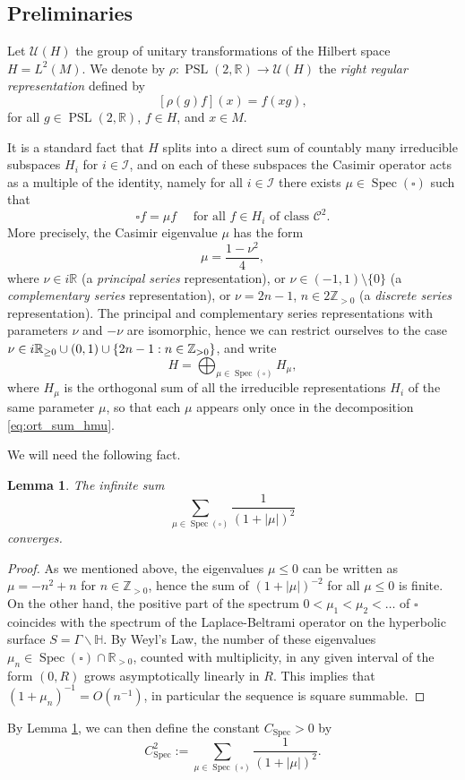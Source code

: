 \documentclass[11pt]{article}
\newcommand \R{\mathbb{R}}
\newcommand \Hbb{\mathbb{H}}
\newcommand \Z{\mathbb{Z}}
\DeclareMathOperator{\PSL}{PSL}
\DeclareMathOperator{\Spec}{Spec}
\newtheorem {lemma}[theorem]{Lemma}
\theoremstyle{definition}
\begin{document}
\subsection{Preliminaries}

Let $\mathcal{U}(H)$ the group of unitary transformations of the Hilbert space $H= L^2(M)$.
We denote by $\rho \colon \PSL(2,\R) \to \mathcal{U}(H)$ the \emph{right regular representation} defined by
\[
[\rho(g)f](x) = f(xg),
\]
for all $g \in \PSL(2,\R)$, $f \in H$, and $x \in M$.

It is a standard fact that $H$ splits into a direct sum of countably many irreducible subspaces $H_{i}$ for $i \in \mathcal{I}$, and on each of these subspaces the Casimir operator acts as a multiple of the identity, namely for all $i \in \mathcal{I}$ there exists $\mu \in \Spec(\square)$ such that
\[
\square f = \mu f \quad \text{ for all $f \in H_i$ of class $\mathscr{C}^2$}.
\]
More precisely, the Casimir eigenvalue $\mu$ has the form
\[
\mu = \frac{1-\nu^2}{4},
\]
where $\nu \in i\R$ (a \emph{principal series} representation), or $\nu \in (-1,1) \setminus \{0\}$ (a \emph{complementary series} representation), or $\nu = 2n-1$, $n \in 2\Z_{>0}$ (a \emph{discrete series} representation).
The principal and complementary series representations with parameters $\nu$ and $-\nu$ are isomorphic, hence we can restrict ourselves to the case $\nu \in i\R_{\geq 0} \cup (0,1) \cup\allowbreak \{ 2n-\nobreak 1 :\nobreak n \in\nobreak \Z_{>0}\}$, and write
\begin{equation}\label{eq:ort_sum_hmu}
H= \bigoplus_{\mu \in \Spec(\square)} H_{\mu},
\end{equation}
where $H_\mu$ is the orthogonal sum of all the irreducible representations $H_i$ of the same parameter $\mu$, so that each $\mu$ appears only once in the decomposition \eqref{eq:ort_sum_hmu}.

We will need the following fact.
\begin{lemma}\label{lemma:Weyl}
The infinite sum
\[
\sum_{\mu \in \Spec(\square)} \frac{1}{(1+|\mu|)^2}
\]
converges.
\end{lemma}
\begin{proof}
As we mentioned above, the eigenvalues $\mu \leq 0$ can be written as $\mu = -n^2+n$ for $n \in \Z_{>0}$, hence the sum of $(1+|\mu|)^{-2}$ for all $\mu\leq 0$ is finite.
On the other hand, the positive part of the spectrum $0<\mu_1 <\mu_2< \dots$ of $\square$ coincides with the spectrum of the Laplace-Beltrami operator on the hyperbolic surface $S =\Gamma \backslash \Hbb$. By Weyl's Law, the number of these eigenvalues $\mu_n \in \Spec(\square) \cap \R_{>0}$, counted with multiplicity, in any given interval of the form $(0,R)$ grows asymptotically linearly in $R$. This implies that $(1+\mu_n)^{-1} = O(n^{-1})$, in particular the sequence is square summable.
\end{proof}
By Lemma \ref{lemma:Weyl}, we can then define the constant $C_{\Spec}>0$ by
\[
C^2_{\Spec}:=\sum_{\mu \in \Spec(\square)} \frac{1}{(1+|\mu|)^2}.
\]
\end{document}
